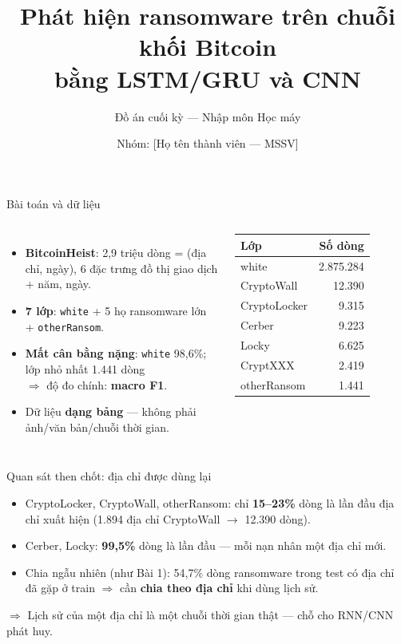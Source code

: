 \documentclass[aspectratio=169,11pt]{beamer}
\title{Phát hiện ransomware trên chuỗi khối Bitcoin\\bằng LSTM/GRU và CNN}
\subtitle{Đồ án cuối kỳ --- Nhập môn Học máy}
\author{Nhóm: [Họ tên thành viên --- MSSV]}
\date{}
\newcommand{\code}[1]{\texttt{#1}}
\begin{document}
\maketitle

\begin{frame}{Bài toán và dữ liệu}
\begin{columns}[T]
\begin{itemize}
\item \textbf{BitcoinHeist}: 2,9 triệu dòng = (địa chỉ, ngày), 6 đặc trưng đồ thị giao dịch + năm, ngày.
\item \textbf{7 lớp}: \code{white} + 5 họ ransomware lớn + \code{otherRansom}.
\item \textbf{Mất cân bằng nặng}: \code{white} 98,6\%; lớp nhỏ nhất 1.441 dòng\\ $\Rightarrow$ độ đo chính: \textbf{macro F1}.
\item Dữ liệu \textbf{dạng bảng} --- không phải ảnh/văn bản/chuỗi thời gian.
\end{itemize}
\small
\begin{tabular}{lr}
\toprule
Lớp & Số dòng \\
\midrule
white & 2.875.284 \\
CryptoWall & 12.390 \\
CryptoLocker & 9.315 \\
Cerber & 9.223 \\
Locky & 6.625 \\
CryptXXX & 2.419 \\
otherRansom & 1.441 \\
\bottomrule
\end{tabular}
\end{columns}
\end{frame}

\begin{frame}{Quan sát then chốt: địa chỉ được dùng lại}
\begin{itemize}
\item CryptoLocker, CryptoWall, otherRansom: chỉ \textbf{15--23\%} dòng là lần đầu địa chỉ xuất hiện
  (1.894 địa chỉ CryptoWall $\to$ 12.390 dòng).
\item Cerber, Locky: \textbf{99,5\%} dòng là lần đầu --- mỗi nạn nhân một địa chỉ mới.
\item Chia ngẫu nhiên (như Bài 1): 54,7\% dòng ransomware trong test có địa chỉ đã gặp ở train $\Rightarrow$ cần
  \textbf{chia theo địa chỉ} khi dùng lịch sử.
\end{itemize}
\vspace{4pt}
\alert{$\Rightarrow$ Lịch sử của một địa chỉ là một chuỗi thời gian thật --- chỗ cho RNN/CNN phát huy.}
\end{frame}
\end{document}
